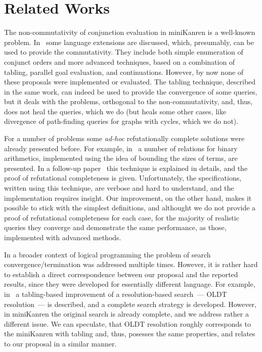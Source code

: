 \section{Related Works}
\label{sec:related_works}

The non-commutativity of conjunction evaluation in miniKanren is a well-known problem. In~\cite{WillThesis} some language
extensions are discussed, which, presumably, can be used to provide the commutativity. They include both simple enumeration
of conjunct orders and more advanced techniques, based on a combination of tabling, parallel goal evaluation, and continuations.
However, by now none of these proposals were implemented or evaluated. The tabling technique, described in the same work, can
indeed be used to provide the convergence of some queries, but it deals with the problems, orthogonal to the non-commutativity,
and, thus, does not heal the queries, which we do (but heals some other cases, like divergence of path-finding queries for
graphs with cycles, which we do not). 

For a number of problems some \emph{ad-hoc} refutationally complete solutions were already presented before. For example,
in~\cite{TRS} a number of relations for binary arithmetics, implemented using the idea of bounding the sizes of terms, are
presented. In a follow-up paper~\cite{KiselyovArithmetic} this technique is explained in details, and the proof of refutational
completeness is given. Unfortunately, the specifications, written using this technique, are verbose and
hard to understand, and the implementation requires insight. Our improvement, on the other hand, makes it possible to stick
with the simplest definitions, and althought we do not provide a proof of refutational completeness for each case, for the
majority of realistic queries they converge and demonstrate the same performance, as those, implemented with advanced methods.

In a broader context of logical programming the problem of search convergence/termination was addressed multiple
times. However, it is rather hard to establish a direct correspondence between our proposal and the reported results,
since they were developed for essentially different language. For example, in~\cite{OLDresolution} a tabling-based
improvement of a resolution-based search~--- OLDT resolution~--- is described, and a complete search strategy is developed.
However, in miniKanren the original search is already complete, and we address rather a different issue. We can speculate,
that OLDT resolution roughly corresponds to the miniKanren with tabling and, thus, posesses the same properties, and relates to
our proposal in a similar manner.

